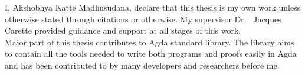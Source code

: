 
I, Akshobhya Katte Madhusudana, declare that this thesis is my own work unless otherwise stated through citations or otherwise. My supervisor Dr. \ Jacques Carette  provided guidance and support at all stages of this work.\\

Major part of this thesis contributes to Agda standard library. The library aims to contain all the tools needed to write both programs and proofs easily in Agda and has been contributed to by many developers and researchers before me.